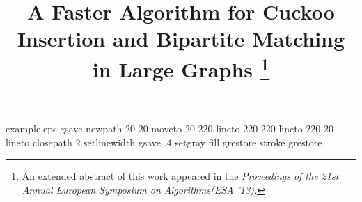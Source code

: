 %
%
%
%
%
\begin{filecontents*}{example.eps}
gsave
newpath
  20 20 moveto
  20 220 lineto
  220 220 lineto
  220 20 lineto
closepath
2 setlinewidth
gsave
  .4 setgray fill
grestore
stroke
grestore
\end{filecontents*}
%
\RequirePackage{fix-cm}
%
\documentclass[smallextended]{svjour3}       %
%
\smartqed  %
%
\usepackage{graphicx}
%
%
%
%
%


\usepackage{color}
\usepackage{amsfonts,amsmath,algorithm,graphicx,subfigure}
\usepackage{booktabs} 
\usepackage[noend]{algorithmic}

\newcommand{\la}{\ell}





\title{A Faster Algorithm for Cuckoo Insertion and Bipartite Matching in Large Graphs \footnote{An extended abstract of this work appeared in the \emph{Proceedings of the 21st Annual European Symposium on Algorithms(ESA '13)\cite{inc:khosla13}.}}%
}


